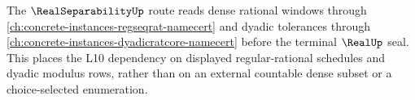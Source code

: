 The $\RealSeparabilityUp$ route reads dense rational windows through \autoref{ch:concrete-instances-regseqrat-namecert} and dyadic tolerances through \autoref{ch:concrete-instances-dyadicratcore-namecert} before the terminal $\RealUp$ seal. This places the L10 dependency on displayed regular-rational schedules and dyadic modulus rows, rather than on an external countable dense subset or a choice-selected enumeration.
